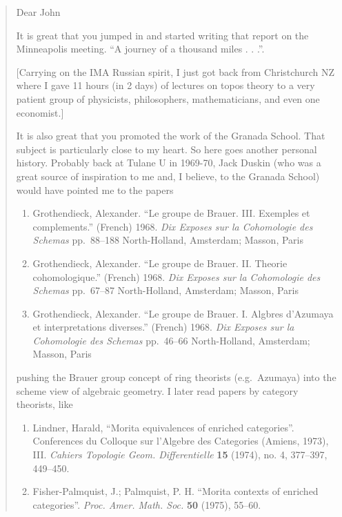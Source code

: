 \documentclass{article}
\begin{document}
\begin{quote}
Dear John

It is great that you jumped in and started writing that report on the
Minneapolis meeting. ``A journey of a thousand miles . . .''.

{[}Carrying on the IMA Russian spirit, I just got back from Christchurch
NZ where I gave 11 hours (in 2 days) of lectures on topos theory to a
very patient group of physicists, philosophers, mathematicians, and even
one economist.{]}

It is also great that you promoted the work of the Granada School. That
subject is particularly close to my heart. So here goes another personal
history. Probably back at Tulane U in 1969-70, Jack Duskin (who was a
great source of inspiration to me and, I believe, to the Granada School)
would have pointed me to the papers

\begin{enumerate}
\def\labelenumi{\arabic{enumi})}
\setcounter{enumi}{32}
\item
  Grothendieck, Alexander. ``Le groupe de Brauer. III. Exemples et
  complements.'' (French) 1968. \emph{Dix Exposes sur la Cohomologie des
  Schemas} pp.~88--188 North-Holland, Amsterdam; Masson, Paris
\item
  Grothendieck, Alexander. ``Le groupe de Brauer. II. Theorie
  cohomologique.'' (French) 1968. \emph{Dix Exposes sur la Cohomologie
  des Schemas} pp.~67--87 North-Holland, Amsterdam; Masson, Paris
\item
  Grothendieck, Alexander. ``Le groupe de Brauer. I. Algbres d'Azumaya
  et interpretations diverses.'' (French) 1968. \emph{Dix Exposes sur la
  Cohomologie des Schemas} pp.~46--66 North-Holland, Amsterdam; Masson,
  Paris
\end{enumerate}

pushing the Brauer group concept of ring theorists (e.g.~Azumaya) into
the scheme view of algebraic geometry. I later read papers by category
theorists, like

\begin{enumerate}
\def\labelenumi{\arabic{enumi})}
\setcounter{enumi}{35}
\item
  Lindner, Harald, ``Morita equivalences of enriched categories''.
  Conferences du Colloque sur l'Algebre des Categories (Amiens, 1973),
  III. \emph{Cahiers Topologie Geom. Differentielle} \textbf{15} (1974),
  no. 4, 377--397, 449--450.
\item
  Fisher-Palmquist, J.; Palmquist, P. H. ``Morita contexts of enriched
  categories''. \emph{Proc. Amer. Math. Soc.} \textbf{50} (1975),
  55--60.
\end{enumerate}


\end{quote}
\end{document}
